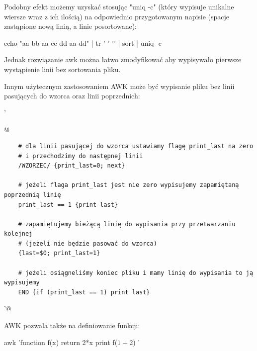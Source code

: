 Podobny efekt możemy uzyskać stosując "uniq -c" (który wypisuje unikalne
wiersze wraz z ich ilością) na odpowiednio przygotowanym napisie
(spacje zastąpione nową linią, a linie posortowane):

\begin{CodeFrame*}[bash]{}
echo "aa bb aa ee dd aa dd" | tr ' ' '\n' | sort | uniq -c
\end{CodeFrame*}
Jednak rozwiązanie awk można łatwo zmodyfikować aby wypisywało pierwsze
wystąpienie linii bez sortowania pliku.

Innym użytecznym zastosowaniem AWK może być wypisanie pliku
bez linii pasujących do wzorca oraz linii poprzednich:

\begin{oframed}\noindent{}\Verb@ '{@\vspace{-0.95em}
\begin{verbatim}
	# dla linii pasującej do wzorca ustawiamy flagę print_last na zero
	# i przechodzimy do następnej linii
	/WZORZEC/ {print_last=0; next}
	
	# jeżeli flaga print_last jest nie zero wypisujemy zapamiętaną poprzednią linię
	print_last == 1 {print last}
	
	# zapamiętujemy bieżącą linię do wypisania przy przetwarzaniu kolejnej
	# (jeżeli nie będzie pasować do wzorca)
	{last=$0; print_last=1}
	
	# jeżeli osiągneliśmy koniec pliku i mamy linię do wypisania to ją wypisujemy
	END {if (print_last == 1) print last}
\end{verbatim}
\vspace{-0.95em}\Verb@}'@\end{oframed}

AWK pozwala także na definiowanie funkcji:
\begin{CodeFrame*}[bash]{}
awk 'function f(x) {return 2*x} { print f($1+$2) }'
\end{CodeFrame*}

